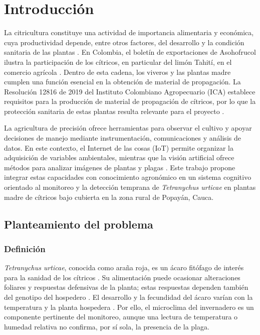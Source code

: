 
\chapter{Introducción}
\label{cap:introduccion}

La citricultura constituye una actividad de importancia alimentaria y económica,
cuya productividad depende, entre otros factores, del desarrollo y la condición
sanitaria de las plantas \cite{gill2023citrus}. En Colombia, el boletín de
exportaciones de Asohofrucol ilustra la participación de los cítricos, en
particular del limón Tahití, en el comercio agrícola \cite{asohofrucol2024}.
Dentro de esta cadena, los viveros y las plantas madre cumplen una función
esencial en la obtención de material de propagación. La Resolución 12816 de 2019
del Instituto Colombiano Agropecuario (ICA) establece requisitos para la
producción de material de propagación de cítricos, por lo que la protección
sanitaria de estas plantas resulta relevante para el proyecto
\cite{ica2019resolucion,citrusCenter2012}.

La agricultura de precisión ofrece herramientas para observar el cultivo y
apoyar decisiones de manejo mediante instrumentación, comunicaciones y análisis
de datos. En este contexto, el Internet de las cosas (IoT) permite organizar la
adquisición de variables ambientales, mientras que la visión artificial ofrece
métodos para analizar imágenes de plantas y plagas
\cite{senoo2023iot,quispe2024lora}. Este trabajo propone integrar estas
capacidades con conocimiento agronómico en un sistema cognitivo orientado al
monitoreo y la detección temprana de \textit{Tetranychus urticae} en plantas madre
de cítricos bajo cubierta en la zona rural de Popayán, Cauca.

\section{Planteamiento del problema}
\label{sec:planteamiento}

\subsection{Definición}
\label{subsec:definicion-problema}

\textit{Tetranychus urticae}, conocida como araña roja, es un ácaro fitófago de
interés para la sanidad de los cítricos \cite{mesa2012acaros}. Su alimentación
puede ocasionar alteraciones foliares y respuestas defensivas de la planta;
estas respuestas dependen también del genotipo del hospedero
\cite{agut2015,gonzalezgonzalez2021}. El desarrollo y la fecundidad del ácaro
varían con la temperatura y la planta hospedera \cite{praslicka2004}. Por ello,
el microclima del invernadero es un componente pertinente del monitoreo, aunque
una lectura de temperatura o humedad relativa no confirma, por sí sola, la
presencia de la plaga.


